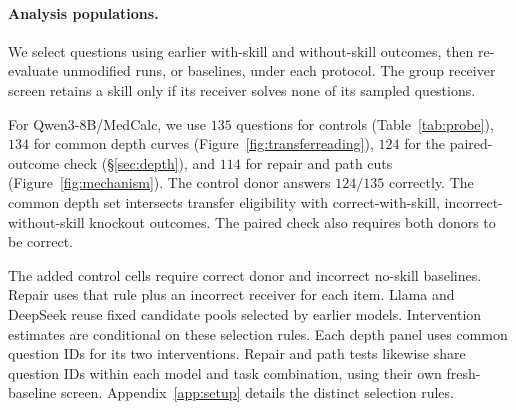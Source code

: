 \begin{table}[t]
\centering
\caption{State-transfer controls at layer $8$ across four models and two
benchmarks. Entries are accuracy (\%). $n/G$ counts questions and skills.
Qwen3-8B/MedCalc retains re-evaluated donor failures. The other cells
additionally require a correct donor and incorrect no-skill baseline.
The two matched-prefix rows replace the same number of leading skill
positions with correct or unrelated content. Final-token controls
replace fewer positions. Layer $8$ is already beyond the transfer
boundary for some models (Table~\ref{tab:paireddepth}).}
\label{tab:probe}
\normalfont\rmfamily\fontsize{9}{11}\selectfont
\renewcommand{\arraystretch}{1.18}
\setlength{\tabcolsep}{2pt}
\setlength{\heavyrulewidth}{0.7pt}
\setlength{\lightrulewidth}{0.3pt}
\setlength{\aboverulesep}{2pt}
\setlength{\belowrulesep}{2.5pt}

\end{table}

\paragraph{Analysis populations.}
We select questions using earlier with-skill and without-skill outcomes,
then re-evaluate unmodified runs, or baselines, under each protocol.
The group receiver screen retains a skill only if its receiver solves
none of its sampled questions.

For Qwen3-8B/MedCalc, we use $135$ questions for controls
(Table~\ref{tab:probe}), $134$ for common depth curves
(Figure~\ref{fig:transferreading}), $124$ for the paired-outcome check
(\S\ref{sec:depth}), and $114$ for repair and path cuts
(Figure~\ref{fig:mechanism}). The control donor answers $124/135$
correctly. The common depth set intersects transfer eligibility with
correct-with-skill, incorrect-without-skill knockout outcomes.
The paired check also requires both donors to be correct.

The added control cells require correct donor and incorrect no-skill
baselines. Repair uses that rule plus an incorrect receiver for each
item. Llama and DeepSeek reuse fixed candidate pools selected by earlier
models. Intervention estimates are conditional on these selection rules.
Each depth panel uses common question IDs for its two interventions.
Repair and path tests likewise share question IDs within each model and
task combination, using their own fresh-baseline screen.
Appendix~\ref{app:setup} details the distinct selection rules.

